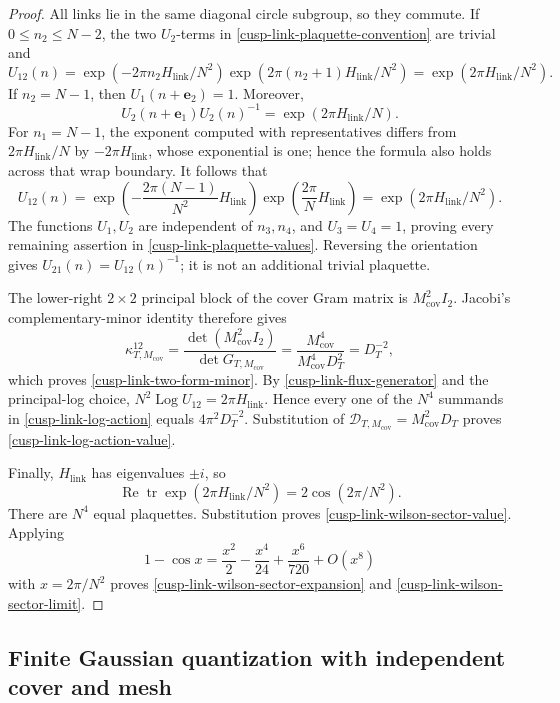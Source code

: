 \begin{proof}
All links lie in the same diagonal circle subgroup, so they commute.  If
\(0\leq n_2\leq N-2\), the two \(U_2\)-terms in
\eqref{cusp-link-plaquette-convention} are trivial and
\[
 U_{12}(n)=
 \exp(-2\pi n_2H_{\mathrm{link}}/N^2)
 \exp(2\pi(n_2+1)H_{\mathrm{link}}/N^2)
 =\exp(2\pi H_{\mathrm{link}}/N^2).
\]
If \(n_2=N-1\), then \(U_1(n+\mathbf e_2)=1\).  Moreover,
\[
 U_2(n+\mathbf e_1)U_2(n)^{-1}=\exp(2\pi H_{\mathrm{link}}/N).
\]
For \(n_1=N-1\), the exponent computed with representatives differs from
\(2\pi H_{\mathrm{link}}/N\) by \(-2\pi H_{\mathrm{link}}\), whose exponential is one; hence the formula
also holds across that wrap boundary.  It follows that
\[
 U_{12}(n)=
 \exp\left(-\frac{2\pi(N-1)}{N^2}H_{\mathrm{link}}\right)
 \exp\left(\frac{2\pi}{N}H_{\mathrm{link}}\right)
 =\exp(2\pi H_{\mathrm{link}}/N^2).
\]
The functions \(U_1,U_2\) are independent of \(n_3,n_4\), and
\(U_3=U_4=1\), proving every remaining assertion in
\eqref{cusp-link-plaquette-values}.  Reversing the orientation gives
\(U_{21}(n)=U_{12}(n)^{-1}\); it is not an additional trivial plaquette.

The lower-right \(2\times2\) principal block of the cover Gram matrix is
\(M_{\mathrm{cov}}^2I_2\).  Jacobi's
complementary-minor identity therefore gives
\[
 \kappa^{12}_{T,M_{\mathrm{cov}}}
 =\frac{\det(M_{\mathrm{cov}}^2I_2)}
        {\det G_{T,M_{\mathrm{cov}}}}
 =\frac{M_{\mathrm{cov}}^4}{M_{\mathrm{cov}}^4D_T^2}
 =D_T^{-2},
\]
which proves \eqref{cusp-link-two-form-minor}.  By
\eqref{cusp-link-flux-generator} and the principal-log choice,
\(N^2\operatorname{Log}U_{12}=2\pi H_{\mathrm{link}}\).  Hence every one of the \(N^4\)
summands in \eqref{cusp-link-log-action} equals
\(4\pi^2D_T^{-2}\).  Substitution of
\(\mathcal D_{T,M_{\mathrm{cov}}}=M_{\mathrm{cov}}^2D_T\) proves
\eqref{cusp-link-log-action-value}.

Finally, \(H_{\mathrm{link}}\) has eigenvalues \(\pm i\), so
\[
 \operatorname{Re}\operatorname{tr}\exp(2\pi H_{\mathrm{link}}/N^2)
 =2\cos(2\pi/N^2).
\]
There are \(N^4\) equal plaquettes.  Substitution proves
\eqref{cusp-link-wilson-sector-value}.  Applying
\[
 1-\cos x=\frac{x^2}{2}-\frac{x^4}{24}
           +\frac{x^6}{720}+O(x^8)
\]
with \(x=2\pi/N^2\) proves
\eqref{cusp-link-wilson-sector-expansion} and
\eqref{cusp-link-wilson-sector-limit}.
\end{proof}

\subsection{Finite Gaussian quantization with independent cover and mesh}

